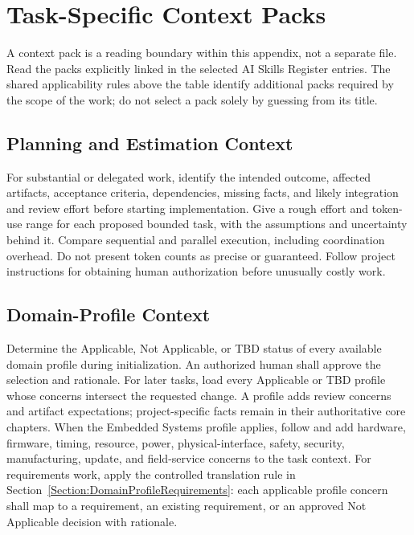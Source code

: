 \section{Task-Specific Context Packs}
A context pack is a reading boundary within this appendix, not a separate file.
Read the packs explicitly linked in the selected AI Skills Register entries. The
shared applicability rules above the table identify additional packs required
by the scope of the work; do not select a pack solely by guessing from its title.

\subsection{Planning and Estimation Context}
\label{Section:AIPlanningEstimateContext}
For substantial or delegated work, identify the intended outcome, affected
artifacts, acceptance criteria, dependencies, missing facts, and likely
integration and review effort before starting implementation. Give a rough
effort and token-use range for each proposed bounded task, with the assumptions
and uncertainty behind it. Compare sequential and parallel execution,
including coordination overhead. Do not present token counts as precise or
guaranteed. Follow project instructions for obtaining human authorization
before unusually costly work.

\subsection{Domain-Profile Context}
\label{Section:AIDomainContext}
Determine the Applicable, Not Applicable, or TBD status of every available
domain profile during initialization. An authorized human shall approve the
selection and rationale. For later tasks, load every Applicable or TBD profile
whose concerns intersect the requested change. A profile adds review concerns
and artifact expectations; project-specific facts remain in their authoritative
core chapters. When the Embedded Systems profile applies, follow
 and add hardware, firmware, timing,
resource, power, physical-interface, safety, security, manufacturing, update,
and field-service concerns to the task context. For requirements work, apply
the controlled translation rule in
Section~\ref{Section:DomainProfileRequirements}: each applicable profile
concern shall map to a requirement, an existing requirement, or an approved
Not Applicable decision with rationale.

